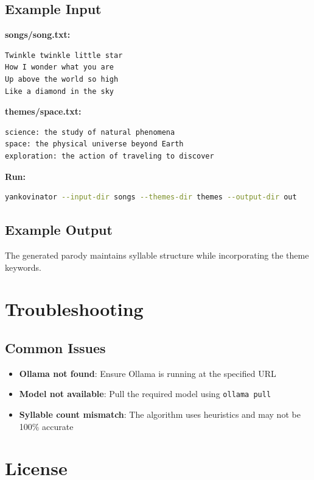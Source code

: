 \documentclass[11pt,a4paper]{article}
\begin{document}
\subsection{Example Input}

\textbf{songs/song.txt:}
\begin{lstlisting}
Twinkle twinkle little star
How I wonder what you are
Up above the world so high
Like a diamond in the sky
\end{lstlisting}

\textbf{themes/space.txt:}
\begin{lstlisting}
science: the study of natural phenomena
space: the physical universe beyond Earth
exploration: the action of traveling to discover
\end{lstlisting}

\textbf{Run:}
\begin{lstlisting}[language=bash]
yankovinator --input-dir songs --themes-dir themes --output-dir out
\end{lstlisting}

\subsection{Example Output}

The generated parody maintains syllable structure while incorporating the theme keywords.

\section{Troubleshooting}

\subsection{Common Issues}

\begin{itemize}
    \item \textbf{Ollama not found}: Ensure Ollama is running at the specified URL
    \item \textbf{Model not available}: Pull the required model using \texttt{ollama pull}
    \item \textbf{Syllable count mismatch}: The algorithm uses heuristics and may not be 100\% accurate
\end{itemize}

\section{License}
\end{document}

